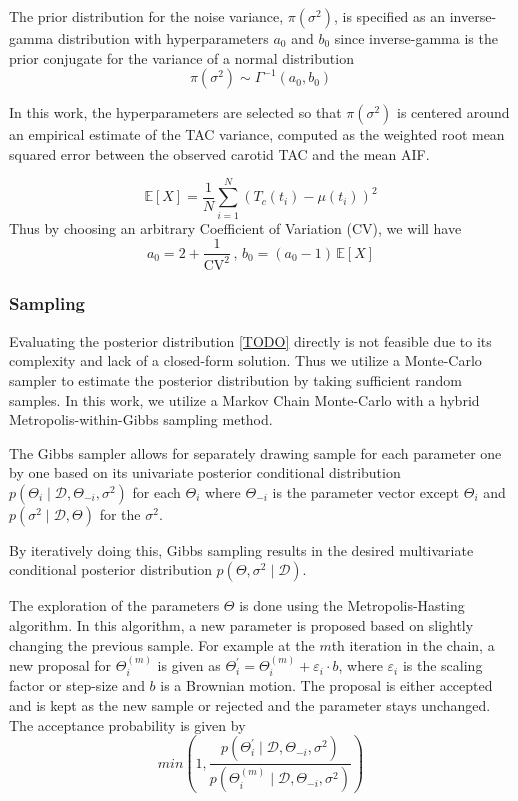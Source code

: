 The prior distribution for the noise variance, $\pi(\sigma^2)$, is specified as an inverse-gamma distribution with hyperparameters $a_0$ and $b_0$ since inverse-gamma is the prior conjugate for the variance of a normal distribution
\[
	\pi(\sigma^2) \sim \Gamma^{-1}(a_0,b_0)
\]

In this work, the hyperparameters are selected so that $\pi(\sigma^2)$ is centered around an empirical estimate of the TAC variance, computed as the weighted root mean squared error between the observed carotid TAC and the mean AIF.

\[
	\mathbb{E}[X] = \frac{1}{N} \sum_{i=1}^{N} (T_c(t_i) - \mu(t_i))^2
\]
Thus by choosing an arbitrary Coefficient of Variation (CV), we will have
\[
	a_0 = 2 + \frac{1}{\mathrm{CV}^2}\, , \, b_0 = (a_0 - 1) \, \mathbb{E}[X]
\]
\subsubsection{Sampling}

Evaluating the posterior distribution \ref{TODO} directly is not feasible due to its complexity and lack of a closed-form solution.
Thus we utilize a Monte-Carlo sampler to estimate the posterior distribution by taking sufficient random samples.
In this work, we utilize a Markov Chain Monte-Carlo with a hybrid Metropolis-within-Gibbs sampling method.

The Gibbs sampler allows for separately drawing sample for each parameter one by one based on its univariate posterior conditional distribution $p(\Theta_i \mid \mathcal{D}, \Theta_{-i}, \sigma^2)$ for each $\Theta_i$ where $\Theta_{-i}$ is the parameter vector except $\Theta_i$ and $p(\sigma^2 \mid \mathcal{D},\Theta)$ for the $\sigma^2$.

By iteratively doing this, Gibbs sampling results in the desired multivariate conditional posterior distribution $p(\Theta,\sigma^2 \mid \mathcal{D})$.

The exploration of the parameters $\Theta$ is done using the Metropolis-Hasting algorithm.
In this algorithm, a new parameter is proposed based on slightly changing the previous sample.
For example at the $m$th iteration in the chain, a new proposal for $\Theta_{i}^{(m)}$ is given as $\Theta_{i}^\prime = \Theta_{i}^{(m)} + \varepsilon_{i} \cdot b$, where $\varepsilon_{i}$ is the scaling factor or step-size and $b$ is a Brownian motion.
The proposal is either accepted and is kept as the new sample or rejected and the parameter stays unchanged.
The acceptance probability is given by
\[
	min\left(1,\frac{p(\Theta_i^\prime \mid \mathcal{D}, \Theta_{-i}, \sigma^2)}{p(\Theta_i^{(m)}\mid \mathcal{D}, \Theta_{-i}, \sigma^2)}\right)
\]

